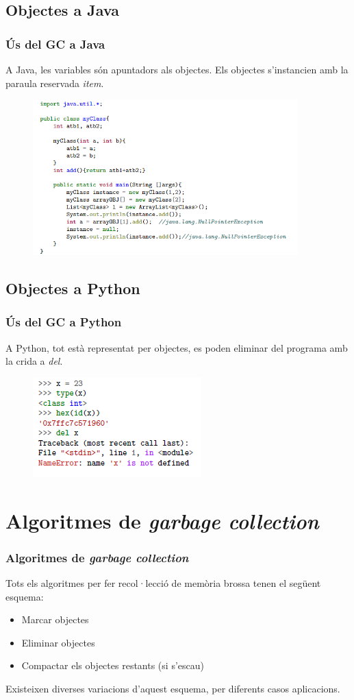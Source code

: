 \documentclass{beamer}
\newcommand{\newSectionFrame}[1]{\section{#1} \begin{frame}\frametitle{#1}}
\begin{document}
    \subsection{Objectes a Java}
    \begin{frame}
        \frametitle{Ús del GC a Java}
        A Java, les variables són apuntadors als objectes. Els objectes s'instancien amb la paraula reservada \textit{item}.
		\begin{figure}
			\centering
			\includegraphics[height=6cm]{JavaEx1.png}
		\end{figure}        
    \end{frame}

    \subsection{Objectes a Python}
    \begin{frame}
		\frametitle{Ús del GC a Python}
		A Python, tot està representat per objectes, es poden eliminar del programa amb la crida a \textit{del}.\\
		\begin{figure}
			\centering
			\includegraphics[scale=0.8]{pythonEx1.png}
		\end{figure}

    \end{frame}

    \newSectionFrame{Algoritmes de \textit{garbage collection}}
		Tots els algoritmes per fer recol·lecció de memòria brossa tenen el següent esquema:
		\begin{itemize}
			\item Marcar objectes
			\item Eliminar objectes 
			\item Compactar els objectes restants (si s'escau)
		\end{itemize}
		Existeixen diverses variacions d'aquest esquema, per diferents casos aplicacions.
    \end{frame}
\end{document}
